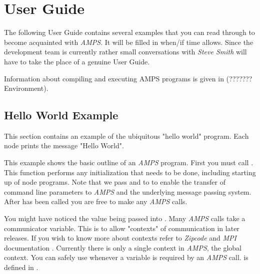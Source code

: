 
\chapter{User Guide}
\label{User Guide}

The following User Guide contains several examples that you can read
through to become acquainted with {\em AMPS}.  It will be filled in
when/if time allows.  Since the development team is currently rather
small conversations with {\em Steve Smith} will have to take the place
of a genuine User Guide.

Information about compiling and executing AMPS programs is given in
(???????Environment).


\section{Hello World Example}
\label{Hello World}

This section contains an example of the ubiquitous "hello world" program.
Each node prints the message "Hello World". 

This example shows the basic outline of an {\em AMPS} program.
First you must call .  This function performs any
initialization that needs to be done, including starting up of node
programs.  Note that we pass  and  to
 to enable the transfer of command line parameters to
{\em AMPS} and the underlying message passing system.  After
 has been called you are free to make any {\em AMPS}
calls.

You might have noticed the  value being passed
into .  Many {\em AMPS} calls take a communicator
variable.  This is to allow "contexts" of communication in later
releases.  If you wish to know more about contexts refer to {\em
Zipcode} and {\em MPI} documentation
\cite{SkLe90,skjellum.smith.ea.93,smith.falgout.ea.93, mpiforum.93,
mpiforum.94}.  Currently there is only a single context in {\em AMPS},
the global context.  You can safely use  whenever
a  variable is required by an {\em AMPS} call.
 is defined in .

